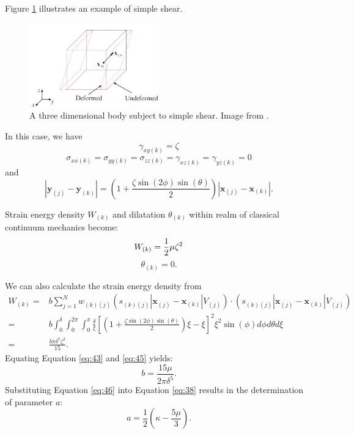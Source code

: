 \documentclass[11pt,fullpage]{article}
\newcommand{\mb}[1]{\mathbf{#1}}
\newcommand{\blue}[1]{#1}
\begin{document}

Figure \blue{\ref{fig:3}} illustrates an example of simple shear.
\begin{figure}[h]
\center
\includegraphics[width=0.5\textwidth]{fig3.png}
\caption{A three dimensional body subject to simple shear. Image from \blue{\cite{madenci2014peridynamic}}.
\label{fig:3}
}
\end{figure}

In this case, we have
\begin{equation}
\gamma_{xy(k)} = \zeta
\label{eq:40}
\end{equation}
\begin{equation}
\sigma_{xx(k)} = \sigma_{yy(k)} = \sigma_{zz(k)} = \gamma_{xz(k)} =\gamma_{yz(k)} = 0
\label{eq:41}
\end{equation}
and
\begin{equation}
|\mb{y}_{(j)} - \mb{y}_{(k)}| = (1+\frac{\zeta\sin(2\phi)\sin(\theta)}{2})|\mb{x}_{(j)} - \mb{x}_{(k)}|.
\label{eq:42}
\end{equation}

Strain energy density $W_{(k)}$ and dilatation $\theta_{(k)}$ within realm of classical continuum mechanics become:
\begin{equation}
W_{(k)} = \frac{1}{2}\mu\zeta^2\\
\label{eq:43}
\end{equation}
\begin{equation}
\theta_{(k)} = 0.
\label{eq:44}
\end{equation}

We can also calculate the strain energy density from
\begin{equation}
\begin{aligned}
W_{(k)} =& b\sum_{j=1}^{N}w_{(k)(j)}(s_{(k)(j)}|\mb{x}_{(j)}-\mb{x}_{(k)}|V_{(j)})\cdot(s_{(k)(j)}|\mb{x}_{(j)}-\mb{x}_{(k)}|V_{(j)})\\
        =& b\int_0^\delta\int_0^{2\pi}\int_0^{\pi}\frac{\delta}{\xi}\left[(1+\frac{\zeta\sin(2\phi)\sin(\theta)}{2})\xi-\xi\right]^2\xi^2\sin(\phi)d\phi d\theta d\xi\\
        =& \frac{b\pi\delta^5\zeta^2}{15}.
\end{aligned}
\label{eq:45}
\end{equation}
Equating Equation \blue{\ref{eq:43}} and \blue{\ref{eq:45}} yields:
\begin{equation}
b = \frac{15\mu}{2\pi\delta^5}.
\label{eq:46}
\end{equation}
Substituting Equation \blue{\ref{eq:46}} into Equation \blue{\ref{eq:38}} results in the determination of parameter $a$:
\begin{equation}
a = \frac{1}{2}(\kappa - \frac{5\mu}{3}).
\label{eq:47}
\end{equation}
\end{document}
